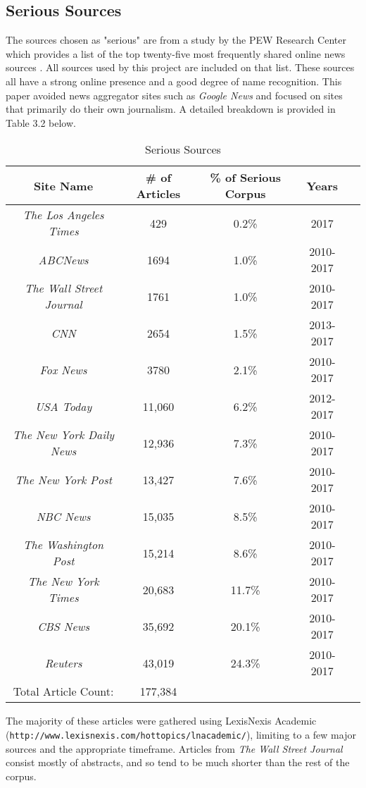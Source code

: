 \documentclass [12 pt] {report}
\begin{document}
\subsection{Serious Sources}
The sources chosen as "serious" are from a study by the PEW Research Center which provides a list of the top twenty-five most frequently shared online news sources \cite{topNews}. All sources used by this project are included on that list. These sources all have a strong online presence and a good degree of name recognition. This paper avoided news aggregator sites such as \textit{Google News} and focused on sites that primarily do their own journalism. A detailed breakdown is provided in Table 3.2 below.
\begin{table}[h]
\caption{Serious Sources}
\vspace{2mm}
\begin{tabular}{|c|c|c|c|c|}
\hline
Site Name & \# of Articles & \% of Serious Corpus & Years\\
\hline
\textit{The Los Angeles Times} & 429 & 0.2\% & 2017\\
\textit{ABCNews} & 1694 & 1.0\% & 2010-2017\\
\textit{The Wall Street Journal} & 1761 & 1.0\% & 2010-2017\\
\textit{CNN} & 2654 & 1.5\% & 2013-2017\\
\textit{Fox News} & 3780 & 2.1\% & 2010-2017\\
\textit{USA Today} & 11,060 & 6.2\% & 2012-2017\\
\textit{The New York Daily News} & 12,936 & 7.3\% & 2010-2017\\
\textit{The New York Post} & 13,427 & 7.6\% & 2010-2017\\
\textit{NBC News} & 15,035 & 8.5\% & 2010-2017\\
\textit{The Washington Post} & 15,214 & 8.6\% & 2010-2017\\
\textit{The New York Times} & 20,683 & 11.7\% & 2010-2017\\
\textit{CBS News} & 35,692 & 20.1\% & 2010-2017\\
\textit{Reuters} & 43,019 & 24.3\% & 2010-2017\\
\hline\hline
Total Article Count: &177,384&  &\\
\hline
\end{tabular}
\label{table:seriousSources}
\end{table}

The majority of these articles were gathered using LexisNexis Academic\\(\texttt{http://www.lexisnexis.com/hottopics/lnacademic/}), limiting to a few major sources and the appropriate timeframe. Articles from \textit{The Wall Street Journal} consist mostly of abstracts, and so tend to be much shorter than the rest of the corpus.
\end{document}
